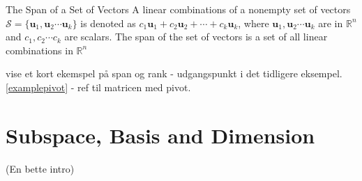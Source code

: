 \begin{definition} {The Span of a Set of Vectors}
A linear combinations of a nonempty set of vectors $\mathcal{S} = \{ \textbf{u}_1,\textbf{u}_2 \cdots \textbf{u}_k\}$ is denoted as $c_1 \textbf{u}_1 + c_2\textbf{u}_2+ \cdots+ c_k\textbf{u}_k$, where $\textbf{u}_1,\textbf{u}_2 \cdots \textbf{u}_k$ are in $\mathbb{R}^n$ and $c_1, c_2 \cdots c_k$ are scalars.
The span of the set of vectors is a set of all linear combinations in $\mathbb{R}^n$
\cite[66]{LiAl}
\end{definition}

vise et kort ekemspel på span og rank - udgangspunkt i det tidligere eksempel. 
\eqref{examplepivot} - ref til matricen med pivot.

\section{Subspace, Basis and Dimension}
(En bette intro)

